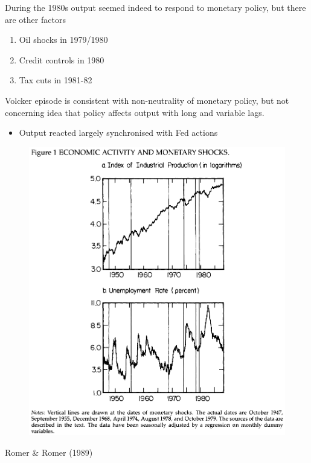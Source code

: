 \documentclass{beamer}
\begin{document}
\begin{frame}
  During the 1980s output seemed indeed to respond to monetary policy, but there are other factors
  \begin{enumerate}
    \item Oil shocks in 1979/1980
    \item Credit controls in 1980
    \item Tax cuts in 1981-82
  \end{enumerate}
  \medskip
  Volcker episode is consistent with non-neutrality of monetary policy, but not concerning idea that policy affects output with long and variable lags.
  \begin{itemize}
    \item Output reacted largely synchronised with Fed actions
  \end{itemize}  
\end{frame}
\begin{frame}
  \begin{figure}
    \includegraphics[scale=.6]{romer_romer.eps}
  \end{figure}
  Romer \& Romer (1989)
\end{frame}
\end{document}
